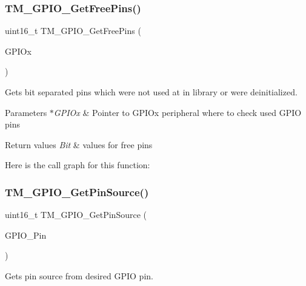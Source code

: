 \subsubsection{\texorpdfstring{T\+M\+\_\+\+G\+P\+I\+O\+\_\+\+Get\+Free\+Pins()}{TM\_GPIO\_GetFreePins()}}
{\footnotesize\ttfamily uint16\+\_\+t T\+M\+\_\+\+G\+P\+I\+O\+\_\+\+Get\+Free\+Pins (\begin{DoxyParamCaption}\item[{G\+P\+I\+O\+\_\+\+Type\+Def $\ast$}]{G\+P\+I\+Ox }\end{DoxyParamCaption})}



Gets bit separated pins which were not used at in library or were deinitialized. 


\begin{DoxyParams}{Parameters}
{\em $\ast$\+G\+P\+I\+Ox} & Pointer to G\+P\+I\+Ox peripheral where to check used G\+P\+IO pins \\
\hline
\end{DoxyParams}

\begin{DoxyRetVals}{Return values}
{\em Bit} & values for free pins \\
\hline
\end{DoxyRetVals}
Here is the call graph for this function\+:
\mbox{\label{group___t_m___g_p_i_o___functions_ga29aaed3ba7054d4c3a3fed55012403e5}} 
\subsubsection{\texorpdfstring{T\+M\+\_\+\+G\+P\+I\+O\+\_\+\+Get\+Pin\+Source()}{TM\_GPIO\_GetPinSource()}}
{\footnotesize\ttfamily uint16\+\_\+t T\+M\+\_\+\+G\+P\+I\+O\+\_\+\+Get\+Pin\+Source (\begin{DoxyParamCaption}\item[{uint16\+\_\+t}]{G\+P\+I\+O\+\_\+\+Pin }\end{DoxyParamCaption})}



Gets pin source from desired G\+P\+IO pin. 

